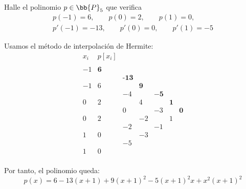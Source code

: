 \begin{ejercicio}
    Halle el polinomio $p \in \bb{P}_5$ que verifica
    \begin{gather*}
        p(-1) = 6,\qquad p(0)=2,\qquad p(1)=0,\\
        p'(-1)=-13,\qquad p'(0)=0,\qquad p'(1)=-5
    \end{gather*}

    Usamos el método de interpolación de Hermite:
    \begin{equation*}
        \begin{array}{c|cccccc}
            x_i & p[x_i] \\
            \\
            -1 & \textbf{6} \\
            && \textbf{-13}\\
            -1 & 6 && \textbf{9}\\
            && -4&&\mathbf{-5}\\
            0 & 2 && 4 && \textbf{1}\\
            && 0 && -3 && \textbf{0}\\
            0 & 2 && -2 && 1\\
            && -2 && -1\\
            1 & 0 && -3\\
            && -5  && \\
            1 & 0\\
        \end{array}
    \end{equation*}

    Por tanto, el polinomio queda:
    \begin{equation*}
        p(x)=6-13(x+1)+9(x+1)^2 -5(x+1)^2x +x^2(x+1)^2
    \end{equation*}
\end{ejercicio}


